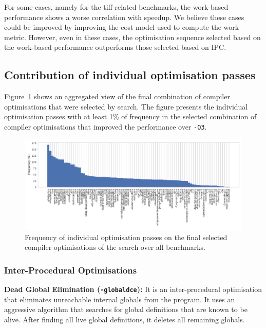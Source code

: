 For some cases, namely for the tiff-related benchmarks, the work-based performance shows a worse correlation with speedup.
We believe these cases could be improved by improving the cost model used to compute the work metric.
However, even in these cases, the optimisation sequence selected based on the work-based performance outperforms those selected based on IPC.

\subsection{Contribution of individual optimisation passes}

Figure~\ref{fig:flagsfreq} shows an aggregated view of the final combination of compiler optimisations that were selected by {\itercomp} search.
The figure presents the individual optimisation passes with at least 1\% of frequency in the selected combination of compiler optimisations that improved the performance over {\texttt{-O3}}.

\begin{figure}[htb]
    \centering
    \includegraphics[width=\textwidth]{figs/flagsfreq.pdf}
    \caption{Frequency of individual optimisation passes on the final selected 
             compiler optimisations of the {\itercomp} search over
             all benchmarks.}
    \label{fig:flagsfreq}
\end{figure}

\subsubsection{Inter-Procedural Optimisations}
\noindent\textbf{Dead Global Elimination (\texttt{-globaldce}):}
It is an inter-procedural optimisation that eliminates unreachable internal globals from the program.
It uses an aggressive algorithm that searches for global definitions that are known to be alive.
After finding all live global definitions, it deletes all remaining globals.

